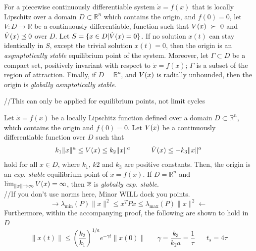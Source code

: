\documentclass[twocolumn]{article}    %
\begin{document}
\begin{remark}
    For a piecewise continuously differentiable system \(\dot{x} = f(x)\) that is locally Lipschitz over a domain \(D\subset \mathds{R}^n\) which contains the origin, and \(f(0) = 0\), let \(V:D\to\mathds{R}\) be a continuously differentiable, function such that \(V(x)~\succ~0\) and \(\dot{V}(x) \preceq 0\) over \(D\). Let \(S =\{x \in D | \dot{V}(x) = 0\} \). If no solution \(x(t)\) can stay identically in \(S\), except the trivial solution \(x(t)=0\), then the origin is an \emph{asymptotically stable} equilibrium point of the system. Moreover, let \(\Gamma \subset D\) be a compact set, positively invariant with respect to \(\dot{x} = f(x)\); \(\Gamma\) is a subset of the region of attraction. Finally, if \(D=\mathds{R}^n\), and \(V(x)\) is radially unbounded, then the origin is \emph{globally asmptotically stable}. 

    //This can only be applied for equilibrium points, not limit cycles
\end{remark}


\begin{remark}
    Let \(\dot{x} = f(x)\) be a locally Lipschitz function defined over a  domain \(D\subset \mathds{R}^n\), which contains the origin and \(f(0) = 0\). Let \(V(x)\) be a continuously differentiable function over \(D\) such that 
    \begin{equation*}
        k_1\|x\|^a \leq V(x) \leq k_2\|x\|^a \hspace{30pt} \dot{V}(x) \leq -k_3\|x\|^a 
    \end{equation*}
    hold for all \(x\in D\), where \(k_1,\,k2\) and \(k_3\) are positive constants. Then, the origin is an \emph{exp. stable} equilibrium point of \(\dot{x} = f(x)\). If \(D =\mathds{R}^n\) and \(\lim_{\|x\|\to\infty} V(x) = \infty\), then \(\overline{x}\) is \emph{globally exp. stable}.\\
    //If you don't use norms here, Minor WILL dock you points.
    \begin{equation*}
        \longrightarrow \lambda_{\min} (P) \|x\|^2 \leq x^TPx \leq \lambda_{\max}(P) \|x\|^2 \longleftarrow
    \end{equation*}
    Furthermore, within the accompanying proof, the following are shown to hold in \(D\)
    \begin{equation*}
        \|x(t)\| \leq \left(\frac{k_2}{k_1}\right)^{1/a} e^{-\gamma t} \|x(0)\| \hspace{20pt} \gamma = \frac{k_3}{k_2 a} = \frac{1}{\tau} \hspace{20pt} t_s = 4\tau
    \end{equation*}
\end{remark}
\end{document}
